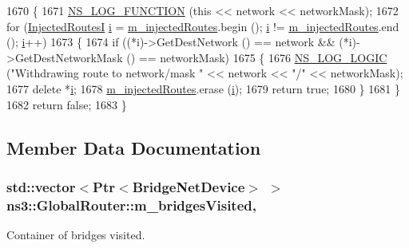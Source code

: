 \begin{DoxyCode}
1670 \{
1671   \hyperlink{log-macros-disabled_8h_a90b90d5bad1f39cb1b64923ea94c0761}{NS\_LOG\_FUNCTION} (\textcolor{keyword}{this} << network << networkMask);
1672   \textcolor{keywordflow}{for} (\hyperlink{classns3_1_1GlobalRouter_ac4ed7a61065c866b6f52abcdb2f29711}{InjectedRoutesI} \hyperlink{bernuolliDistribution_8m_a6f6ccfcf58b31cb6412107d9d5281426}{i} = \hyperlink{classns3_1_1GlobalRouter_a2d1dd8dbb1bc813f24bff2fb2f0cde7f}{m\_injectedRoutes}.begin (); 
      \hyperlink{bernuolliDistribution_8m_a6f6ccfcf58b31cb6412107d9d5281426}{i} != \hyperlink{classns3_1_1GlobalRouter_a2d1dd8dbb1bc813f24bff2fb2f0cde7f}{m\_injectedRoutes}.end (); \hyperlink{bernuolliDistribution_8m_a6f6ccfcf58b31cb6412107d9d5281426}{i}++)
1673     \{
1674       \textcolor{keywordflow}{if} ((*i)->GetDestNetwork () == network && (*i)->GetDestNetworkMask () == networkMask)
1675         \{
1676           \hyperlink{group__logging_ga88acd260151caf2db9c0fc84997f45ce}{NS\_LOG\_LOGIC} (\textcolor{stringliteral}{"Withdrawing route to network/mask "} << network << \textcolor{stringliteral}{"/"} << networkMask);
1677           \textcolor{keyword}{delete} *\hyperlink{bernuolliDistribution_8m_a6f6ccfcf58b31cb6412107d9d5281426}{i};
1678           \hyperlink{classns3_1_1GlobalRouter_a2d1dd8dbb1bc813f24bff2fb2f0cde7f}{m\_injectedRoutes}.erase (\hyperlink{bernuolliDistribution_8m_a6f6ccfcf58b31cb6412107d9d5281426}{i});
1679           \textcolor{keywordflow}{return} \textcolor{keyword}{true};
1680         \}
1681     \}
1682   \textcolor{keywordflow}{return} \textcolor{keyword}{false};
1683 \}
\end{DoxyCode}


\subsection{Member Data Documentation}
\subsubsection[{\texorpdfstring{m\+\_\+bridges\+Visited}{m_bridgesVisited}}]{\setlength{\rightskip}{0pt plus 5cm}std\+::vector$<${\bf Ptr}$<${\bf Bridge\+Net\+Device}$>$ $>$ ns3\+::\+Global\+Router\+::m\+\_\+bridges\+Visited\hspace{0.3cm}{\ttfamily [mutable]}, {\ttfamily [private]}}\hypertarget{classns3_1_1GlobalRouter_ad1b09bb4b76610b276fb065a0cb8dee6}{}\label{classns3_1_1GlobalRouter_ad1b09bb4b76610b276fb065a0cb8dee6}
Container of bridges visited. 
